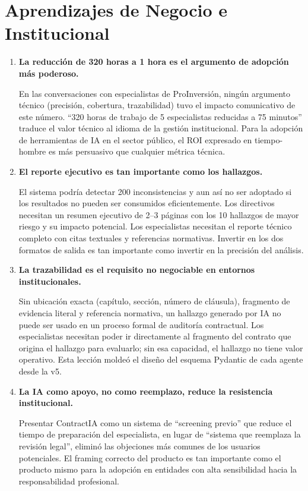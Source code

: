\section*{Aprendizajes de Negocio e Institucional}

\begin{enumerate}

    \item \textbf{La reducción de 320 horas a 1 hora es el argumento de adopción más poderoso.}

    En las conversaciones con especialistas de ProInversión, ningún argumento
    técnico (precisión, cobertura, trazabilidad) tuvo el impacto comunicativo
    de este número. ``320 horas de trabajo de 5 especialistas reducidas a
    75 minutos'' traduce el valor técnico al idioma de la gestión institucional.
    Para la adopción de herramientas de IA en el sector público, el ROI
    expresado en tiempo-hombre es más persuasivo que cualquier métrica técnica.

    \item \textbf{El reporte ejecutivo es tan importante como los hallazgos.}

    El sistema podría detectar 200 inconsistencias y aun así no ser adoptado
    si los resultados no pueden ser consumidos eficientemente. Los directivos
    necesitan un resumen ejecutivo de 2--3 páginas con los 10 hallazgos
    de mayor riesgo y su impacto potencial. Los especialistas necesitan
    el reporte técnico completo con citas textuales y referencias normativas.
    Invertir en los dos formatos de salida es tan importante como invertir
    en la precisión del análisis.

    \item \textbf{La trazabilidad es el requisito no negociable en entornos institucionales.}

    Sin ubicación exacta (capítulo, sección, número de cláusula), fragmento
    de evidencia literal y referencia normativa, un hallazgo generado por
    IA no puede ser usado en un proceso formal de auditoría contractual.
    Los especialistas necesitan poder ir directamente al fragmento del
    contrato que origina el hallazgo para evaluarlo; sin esa capacidad,
    el hallazgo no tiene valor operativo. Esta lección moldeó el diseño
    del esquema Pydantic de cada agente desde la v5.

    \item \textbf{La IA como apoyo, no como reemplazo, reduce la resistencia institucional.}

    Presentar ContractIA como un sistema de ``screening previo'' que
    reduce el tiempo de preparación del especialista, en lugar de
    ``sistema que reemplaza la revisión legal'', eliminó las objeciones
    más comunes de los usuarios potenciales. El framing correcto del
    producto es tan importante como el producto mismo para la adopción
    en entidades con alta sensibilidad hacia la responsabilidad profesional.


\end{enumerate}
